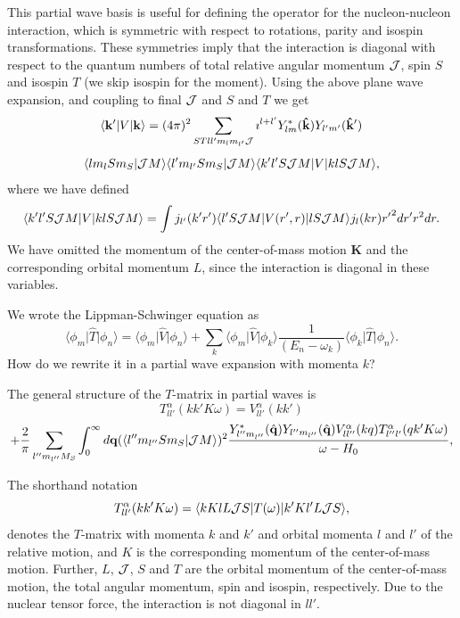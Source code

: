 \documentclass[%
oneside,                 %
final,                   %
10pt]{article}
\begin{document}
This partial wave basis is useful for defining the operator for
the nucleon-nucleon interaction, which
is symmetric with respect to rotations, parity and
isospin transformations. These symmetries imply that the interaction is
diagonal with respect to the quantum numbers of total relative angular
momentum ${\cal J}$, spin $S$ and isospin $T$ (we skip isospin for the moment). Using the above plane wave expansion,
and coupling to final ${\cal J}$ and $S$ and $T$ we get
\[
 \langle\mathbf{k'}\vert V \vert\mathbf{k}\rangle= (4\pi)^2 \sum_{STll'm_lm_{l'}{\cal J}}\imath^{l+l'} Y_{lm}^{*}(\mathbf{\hat{k}}) Y_{l'm'}(\mathbf{\hat{k}'})
\]
\[
\langle lm_lSm_S|{\cal J}M\rangle \langle l'm_{l'}Sm_S|{\cal J}M\rangle\langle k'l'S{\cal J}M\vert V \vert klS{\cal J}M\rangle,
\]
where we have defined
\[
    \langle k'l'S{\cal J}M\vert V \vert klS{\cal J}M\rangle=\int j_{l'}(k'r')\langle l'S{\cal J}M\vert V(r',r)\vert lS{\cal J}M\rangle j_l(kr) {r'}^2 dr' r^2 dr.
\]
We have omitted the momentum of the center-of-mass motion $\mathbf{K}$ and the 
corresponding orbital momentum $L$, since the interaction is diagonal
in these variables.

We wrote the Lippman-Schwinger equation as
\[
\langle \phi_m \vert\hat{T}\vert \phi_n \rangle =\langle \phi_m \vert\hat{V}\vert\phi_n \rangle+\sum_k \langle \phi_m \vert\hat{V}\vert \phi_k\rangle\frac{1}{(E_n -\omega_k)}\langle \phi_k \vert\hat{T}\vert \phi_n \rangle.
\]
How do we rewrite it in a partial wave expansion with momenta $k$?

The general structure of the $T$-matrix in partial waves is
\[
   T_{ll'}^{\alpha}(kk'K\omega)=V_{ll'}^{\alpha}(kk')
\]
\begin{equation}
   +{\displaystyle \frac{2}{\pi}\sum_{l''m_{l''}M_S}\int_{0}^{\infty} d \mathbf{q}
   (\langle l''m_{l''}Sm_S|{\cal J}M\rangle)^2
   \frac{Y_{l''m_{l''}}^*(\hat{\mathbf{q}})
   Y_{l''m_{l''}}(\hat{\mathbf{q}}) V_{ll''}^{\alpha}(kq)
   T_{l''l'}^{\alpha}(qk'K\omega)}
   {\omega -H_0}},
   \label{eq:bspartial}
\end{equation}

The  shorthand notation
\[
    T_{ll'}^{\alpha}(kk'K\omega)=
   \langle kKlL{\cal J}S\vert T(\omega)\vert k'Kl'L{\cal J}S\rangle,
\]
denotes the $T$-matrix
with momenta $k$ and $k'$ and orbital momenta $l$ and $l'$
of the relative motion, and
$K$ is the corresponding momentum of
the center-of-mass motion. Further, $L$, ${\cal J}$, $S$ and $T$
are the orbital momentum of the center-of-mass motion, the
total angular momentum,
spin and isospin, respectively. 
Due to the nuclear tensor force, the interaction is not diagonal in $ll'$.
\end{document}
